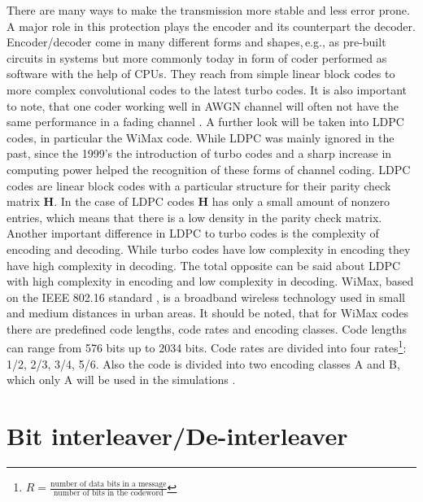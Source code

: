There are many ways to make the transmission more stable and less error prone. A major role in this protection plays the encoder and its counterpart the decoder. Encoder/decoder come in many different forms and shapes,\,e.g., as pre-built circuits in systems but more commonly today in form of coder performed as software with the help of CPUs. They reach from simple linear block codes to more complex convolutional codes to the latest turbo codes. It is also important to note, that one coder working well in \gls{AWGN} channel will often not have the same performance in a fading channel \cite[p.~262]{Goldsmith08}.
\newline
A further look will be taken into \gls{LDPC} codes, in particular the WiMax code. While \gls{LDPC} was mainly ignored in the past, since the 1999's the introduction of turbo codes and a sharp increase in computing power helped the recognition of these forms of channel coding.
\newline
\gls{LDPC} codes are linear block codes with a particular structure for their parity check matrix \textbf{H}. In the case of \gls{LDPC} codes \textbf{H} has only a small amount of nonzero entries, which means that there is a low density in the parity check matrix.
Another important difference in LDPC to turbo codes is the complexity of encoding and decoding. While turbo codes have low complexity in encoding they have high complexity in decoding. The total opposite can be said about \gls{LDPC} with high complexity in encoding and low complexity in decoding.  
\newline
WiMax, based on the IEEE 802.16 standard \cite{WiMaxTech}, is a broadband wireless technology used in small and medium distances in urban areas. It should be noted, that for WiMax codes there are predefined code lengths, code rates and encoding classes. Code lengths can range from 576 bits up to 2034 bits. Code rates are divided into four rates\footnote{$R = \frac{\textrm{number of data bits in a message}}{\textrm{number of bits in the codeword}} $}: 1/2, 2/3, 3/4, 5/6. Also the code is divided into two encoding classes A and B, which only A will be used in the simulations \cite{WIMAX}.
\newpage

\section{Bit interleaver/De-interleaver}
\label{sec:interleaver}

